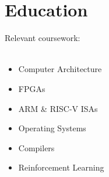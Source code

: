 \documentclass{moderncv}
\begin{document}

\section{Education}
{
    Relevant coursework:\\
    \\
\begin{minipage}{0.3\textwidth}
\begin{itemize}
    \item Computer Architecture
    \item FPGAs
    \item ARM \& RISC-V ISAs
\end{itemize}
\end{minipage}
\begin{minipage}{0.3\textwidth}
\begin{itemize}
    \item Operating Systems
    \item Compilers
    \item Reinforcement Learning
\end{itemize}
\end{minipage}
}
\end{document}
